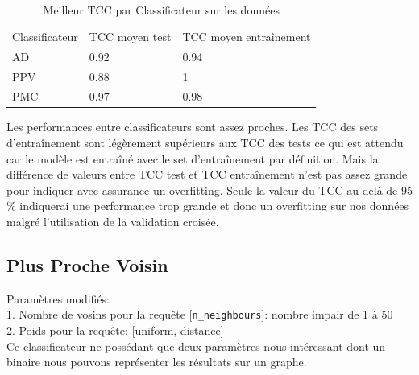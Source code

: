 \documentclass[10pt,letterpaper]{article}
\newlength\savedwidth
\newcommand\thickhline{\noalign{\global\savedwidth\arrayrulewidth\global\arrayrulewidth 2pt}%
\hline
\noalign{\global\arrayrulewidth\savedwidth}}
\begin{document}
\begin{table}[h]
  \centering
  \caption{Meilleur TCC par Classificateur sur les données  \protect{}}
\begin{tabular}{lll}
\hline
Classificateur & TCC moyen test 
 & TCC moyen entraînement
\\ \thickhline
AD & \hspace{5mm}0.92 & \hspace{20mm}0.94
 \\ \hline
PPV & \hspace{5mm}0.88 & \hspace{20mm}1 \\ \hline
PMC & \hspace{5mm}0.97 & \hspace{20mm}0.98\\ \hline
\end{tabular}
\end{table}
Les performances entre classificateurs sont assez proches. 
Les TCC des sets d’entraînement sont légèrement supérieurs aux TCC des tests ce qui est attendu car le modèle est entraîné avec le set d’entraînement par définition. Mais la différence de valeurs entre TCC test et TCC entraînement n’est pas assez grande pour indiquer avec assurance un overfitting. 
Seule la valeur du TCC au-delà de 95 \% indiquerai une performance trop grande et donc un overfitting sur nos données malgré l’utilisation de la validation croisée.

\subsection*{Plus Proche Voisin}
Paramètres modifiés:\\
1. Nombre de vosins pour la requête [\verb!n_neighbours!]: nombre impair de 1 à 50\\
2. Poids pour la requête: [uniform, distance]\\
\vspace{1mm}
Ce classificateur ne possédant que deux paramètres nous intéressant dont un binaire nous pouvons représenter les résultats sur un graphe.
\end{document}
